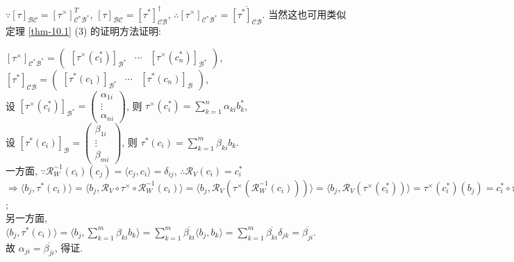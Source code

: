 \documentclass{note}
\begin{document}
$\because[\tau]_{\mathcal{BC}}=[\tau^{\times}]_{\mathcal{C}^*\mathcal{B}^*}^T$, $[\tau]_{\mathcal{BC}}=[\tau^*]_{\mathcal{CB}}^{\dagger}$, $\therefore[\tau^{\times}]_{\mathcal{C}^*\mathcal{B}^*}=\overline{[\tau^*]_{\mathcal{CB}}}$. 当然这也可用类似定理 \ref{thm-10.1} (3) 的证明方法证明:
\begin{pf}
    $[\tau^{\times}]_{\mathcal{C}^*\mathcal{B}^*}=\begin{pmatrix}
        [\tau^{\times}(c_1^*)]_{\mathcal{B}^*}&\cdots&[\tau^{\times}(c_n^*)]_{\mathcal{B}^*}
    \end{pmatrix}$, $[\tau^*]_{\mathcal{CB}}=\begin{pmatrix}
        [\tau^*(c_1)]_{\mathcal{B}^*}&\cdots&[\tau^*(c_n)]_{\mathcal{B}}
    \end{pmatrix}$,\\
    设 $[\tau^{\times}(c_i^*)]_{\mathcal{B}^*}=\begin{pmatrix}
        \alpha_{1i}\\
        \vdots\\
        \alpha_{ni}
    \end{pmatrix}$, 则 $\tau^{\times}(c_i^*)=\sum_{k=1}^n\alpha_{ki}b_k^*$,\\
    设 $[\tau^*(c_i)]_{\mathcal{B}}=\begin{pmatrix}
        \beta_{1i}\\
        \vdots\\
        \beta_{mi}
    \end{pmatrix}$, 则 $\tau^*(c_i)=\sum_{k=1}^m\beta_{ki}b_k$.\\
    一方面, $\because\mathcal{R}_W^{-1}(c_i)(c_j)=\langle c_j,c_i\rangle=\delta_{ij}$, $\therefore\mathcal{R}_V(c_i)=c_i^*$\\
    $\Longrightarrow\langle b_j,\tau^*(c_i)\rangle=\langle b_j,\mathcal{R}_V\circ\tau^{\times}\circ\mathcal{R}_W^{-1}(c_i)\rangle=\langle b_j,\mathcal{R}_V(\tau^{\times}(\mathcal{R}_W^{-1}(c_i)))\rangle=\langle b_j,\mathcal{R}_V(\tau^{\times}(c_i^*))\rangle=\tau^{\times}(c_i^*)(b_j)=c_i^*\circ\tau^{\times}(b_j)=\left(\sum_{k=1}^n\alpha_{ki}b_k^*\right)(b_j)=\sum_{k=1}^n\alpha_{ki}b_k^*(b_j)=\sum_{k=1}^n\alpha_{ki}\delta_{jk}=\alpha_{ji}$;\\
    另一方面, $\langle b_j,\tau^*(c_i)\rangle=\langle b_j,\sum_{k=1}^m\beta_{ki}b_k\rangle=\sum_{k=1}^m\overline{\beta_{ki}}\langle b_j,b_k\rangle=\sum_{k=1}^m\overline{\beta_{ki}}\delta_{jk}=\overline{\beta_{ji}}$.\\
    故 $\alpha_{ji}=\overline{\beta_{ji}}$, 得证.
\end{pf}
\end{document}

